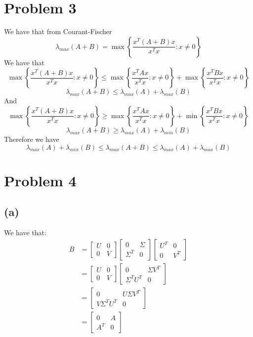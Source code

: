 \documentclass[11pt]{article}
\begin{document}
\section*{Problem 3}
We have that from Courant-Fischer
$$\lambda_{max}(A+B) = \max\left\{\frac{x^T(A+B)x}{x^Tx}:x\neq 0\right\}$$
We have that 
$$\max\left\{\frac{x^T(A+B)x}{x^Tx}:x\neq 0\right\} \leq \max\left\{\frac{x^TAx}{x^Tx}:x\neq 0\right\}+\max\left\{\frac{x^TBx}{x^Tx}:x\neq 0\right\}$$
$$\lambda_{max}(A+B) \leq \lambda_{max}(A)+\lambda_{max}(B)$$
And 
$$\max\left\{\frac{x^T(A+B)x}{x^Tx}:x\neq 0\right\} \geq \max\left\{\frac{x^TAx}{x^Tx}:x\neq 0\right\}+\min\left\{\frac{x^TBx}{x^Tx}:x\neq 0\right\}$$
$$\lambda_{max}(A+B) \geq \lambda_{max}(A)+\lambda_{min}(B)$$
Therefore we have 
$$\lambda_{max}(A)+\lambda_{min}(B)\leq \lambda_{max}(A+B) \leq \lambda_{max}(A)+\lambda_{max}(B)$$
\section*{Problem 4}
\subsection*{(a)}
We have that:
\begin{align*}
    B &= \begin{bmatrix}
        U & 0\\
        0 & V
    \end{bmatrix}
    \begin{bmatrix}
        0 & \Sigma\\
        \Sigma^T & 0
    \end{bmatrix}\begin{bmatrix}
        U^T & 0\\
        0 & V^T
    \end{bmatrix}\\
    &= \begin{bmatrix}
        U & 0\\
        0 & V
    \end{bmatrix}
    \begin{bmatrix}
        0 & \Sigma V^T\\
        \Sigma^TU^T & 0
    \end{bmatrix}\\
    &= \begin{bmatrix}
        0 & U\Sigma V^T\\
        V\Sigma^TU^T & 0
    \end{bmatrix}\\
    &= \begin{bmatrix}
        0 & A\\
        A^T & 0
    \end{bmatrix}
\end{align*}
\end{document}
